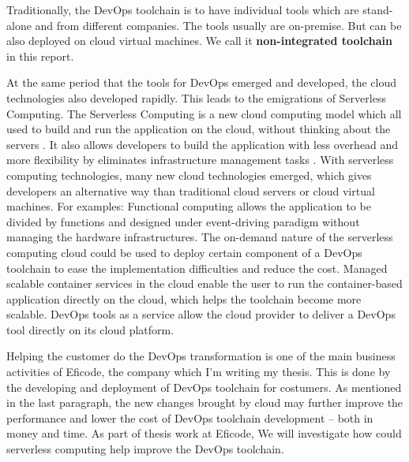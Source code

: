 \par
Traditionally, the DevOps toolchain is to have individual tools which are stand-alone and from different companies. The tools usually are on-premise. But can be also deployed on cloud virtual machines. We call it
\textbf{non-integrated toolchain} in this report.
\par
At the same period that the tools for DevOps emerged and developed, the cloud technologies also developed rapidly. This leads to the emigrations of Serverless Computing. 
The Serverless Computing is a new cloud computing model which all used to build and run the application on the cloud, without thinking about the servers \cite{Serverle81:online}. It also allows developers to build the application with less overhead \cite{Serverle81:online} and more flexibility by eliminates infrastructure management tasks \cite{Serverle73:online}.
With serverless computing technologies, many new cloud technologies emerged, which gives developers an alternative way than traditional cloud servers or cloud virtual machines. For examples: Functional computing allows the application to be divided by functions and designed under event-driving paradigm without managing the hardware infrastructures. The on-demand nature of the serverless computing cloud could be used to deploy certain component of a DevOps toolchain to ease the implementation difficulties and reduce the cost. Managed scalable container services in the cloud enable the user to run the container-based application directly on the cloud, which helps the toolchain become more scalable. DevOps tools as a service \cite{DevOpsas45:online} allow the cloud provider to deliver a DevOps tool directly on its cloud platform.
\par
Helping the customer do the DevOps transformation is one of the main business activities of Eficode, the company which I'm writing my thesis. This is done by the developing and deployment of DevOps toolchain for costumers. As mentioned in the last paragraph, the new changes brought by cloud may further improve the performance and lower the cost of DevOps toolchain development -- both in money and time. As part of thesis work at Eficode, We will investigate how could serverless computing help improve the DevOps toolchain. 
